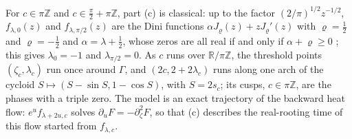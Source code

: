 \documentclass[11pt]{amsart}
\theoremstyle{definition}
\theoremstyle{remark}
\numberwithin{equation}{section}
\newcommand{\R}{\mathbb{R}}
\newcommand{\Z}{\mathbb{Z}}
\begin{document}
For $c\in\pi\Z$ and $c\in\frac\pi2+\pi\Z$, part (c) is classical: up to the factor $(2/\pi)^{1/2}z^{-1/2}$,
$f_{\lambda,0}(z)$ and $f_{\lambda,\pi/2}(z)$ are the Dini functions $\alpha J_\varrho(z)+zJ_\varrho'(z)$ with $\varrho=\frac12$ and
$\varrho=-\frac12$ and $\alpha=\lambda+\frac12$, whose zeros are all real if and only if $\alpha+\varrho\ge0$ \cite[\S15.25, p.~482]{Wat};
this gives $\lambda_0=-1$ and $\lambda_{\pi/2}=0$. As $c$ runs over $\R/\pi\Z$, the threshold points $(\zeta_c,\lambda_c)$
run once around $\Gamma$, and $(2c,2+2\lambda_c)$ runs along one arch of the cycloid $S\mapsto(S-\sin S,1-\cos S)$, with
$S=2s_c$; its cusps, $c\in\pi\Z$, are the phases with a triple zero. The model is an exact trajectory of the backward
heat flow: $e^uf_{\lambda+2u,c}$ solves $\partial_uF=-\partial_\zeta^2F$, so that (c) describes the real-rooting time of
this flow started from $f_{\lambda,c}$.
\end{document}
